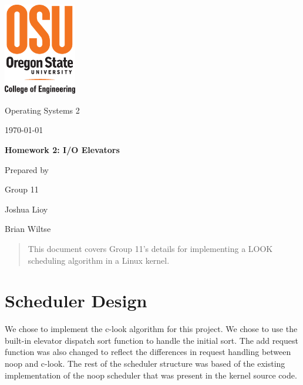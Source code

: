 \documentclass[letterpaper, onecolumn, draftclsnofoot, 10pt, compsoc]{IEEEtran}
\def \GroupNumber{11}
\def \GroupMemberOne{Joshua Lioy}
\def \GroupMemberTwo{Brian Wiltse}
\begin{document}
\begin{titlepage}
    \begin{singlespace}
    	\includegraphics[height=4cm]{coe_v_spot1}
        \hfill 
        \par\vspace{.2in}
        \centering
        \scshape{
            \huge Operating Systems 2 \par
            {\large\today}\par
            \vspace{.5in}
            \textbf{\Huge Homework 2: I/O Elevators}\par
            \vfill
            \vspace{5pt}
            {\large Prepared by }\par
            Group \GroupNumber\par
            \vspace{5pt}
            {\Large
                \GroupMemberOne\par
                \GroupMemberTwo\par
            }
            \vspace{20pt}
        }
        \begin{abstract}
        This document covers Group 11's details for implementing a LOOK scheduling algorithm in a Linux kernel.
        \end{abstract}     
    \end{singlespace}
\end{titlepage}

\newpage
{}
\tableofcontents

\newpage
\section{Scheduler Design}
    \begin{singlespace}
        We chose to implement the c-look algorithm for this project. We chose to use the built-in elevator dispatch sort function to handle the initial sort. The add request function was also changed to reflect the differences in request handling between noop and c-look. The rest of the scheduler structure was based of the existing implementation of the noop scheduler that was present in the kernel source code.
    \end{singlespace}
    
\end{document}
